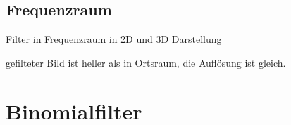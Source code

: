\documentclass[12pt]{article}
\begin{document}
\subsection{Frequenzraum}
Filter in Frequenzraum in 2D und 3D Darstellung
\begin{figure}[ht]\centering
\end{figure}
\newline
gefilteter Bild ist heller als in Ortsraum, die Auflösung ist gleich.
\begin{figure}[ht]\centering
\end{figure}
\section{Binomialfilter}
\end{document}
